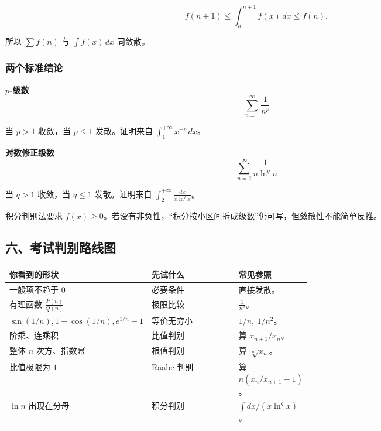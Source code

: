\[
      f(n+1)\le
      \int_n^{n+1}f(x)\,dx
      \le f(n),
    \]

所以 \(\sum f(n)\) 与 \(\int f(x)\,dx\) 同敛散。

\subsubsection*{两个标准结论}

\begin{conceptbox}
\textbf{\(p\)-级数}
\[
          \sum_{n=1}^{\infty}\frac1{n^p}
        \]

当 \(p>1\) 收敛，当 \(p\le1\) 发散。证明来自 \(\int_1^{+\infty}x^{-p}\,dx\)。
\end{conceptbox}

\begin{conceptbox}
\textbf{对数修正级数}
\[
          \sum_{n=2}^{\infty}\frac1{n\ln^q n}
        \]

当 \(q>1\) 收敛，当 \(q\le1\) 发散。证明来自 \(\int_2^{+\infty}\frac{dx}{x\ln^q x}\)。
\end{conceptbox}

\begin{notebox}
积分判别法要求 \(f(x)\ge0\)。若没有非负性，“积分按小区间拆成级数”仍可写，但敛散性不能简单反推。
\end{notebox}

\subsection*{六、考试判别路线图}

\begin{center}
\small
\begin{tabularx}{\linewidth}{|>{\raggedright\arraybackslash}p{0.18\linewidth}|>{\raggedright\arraybackslash}p{0.42\linewidth}|>{\raggedright\arraybackslash}X|}
\hline
\textbf{你看到的形状} & \textbf{先试什么} & \textbf{常见参照} \\ \hline
一般项不趋于 \(0\) & 必要条件 & 直接发散。 \\ \hline
有理函数 \(\frac{P(n)}{Q(n)}\) & 极限比较 & \(\frac1{n^p}\)。 \\ \hline
\(\sin(1/n),1-\cos(1/n),e^{1/n}-1\) & 等价无穷小 & \(1/n,\ 1/n^2\)。 \\ \hline
阶乘、连乘积 & 比值判别 & 算 \(x_{n+1}/x_n\)。 \\ \hline
整体 \(n\) 次方、指数幂 & 根值判别 & 算 \(\sqrt[n]{x_n}\)。 \\ \hline
比值极限为 \(1\) & Raabe 判别 & 算 \(n(x_n/x_{n+1}-1)\)。 \\ \hline
\(\ln n\) 出现在分母 & 积分判别 & \(\int dx/(x\ln^q x)\)。 \\ \hline
\end{tabularx}
\end{center}

